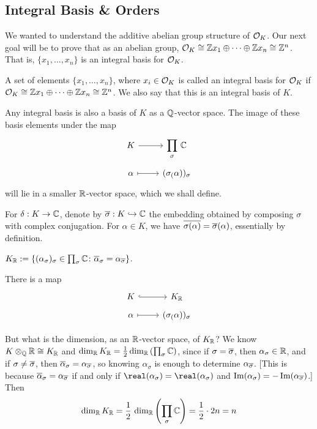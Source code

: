 \subsection{Integral Basis \& Orders}


We wanted to understand the additive abelian group structure of $\mathcal{O}_K$. Our next goal will be to prove that as an abelian group, $\mathcal{O}_K \cong \mathbb{Z} x_1 \oplus \cdots \oplus \mathbb{Z} x_n \cong \mathbb{Z}^n$. That is, $\{x_1,\ldots,x_n\}$ is an integral basis for $\mathcal{O}_K$. 

\begin{dfn}
A set of elements $\{x_1,\ldots,x_n\}$, where $x_i \in \mathcal{O}_K$ is called an integral basis for $\mathcal{O}_K$ if $\mathcal{O}_K \cong \mathbb{Z} x_1 \oplus \cdots \oplus \mathbb{Z} x_n \cong \mathbb{Z}^n$. We also say that this is an integral basis of $K$.
\end{dfn}

Any integral basis is also a basis of $K$ as a $\mathbb{Q}$-vector space. The image of these basis elements under the map
	\[
	\begin{tikzcd}
	K \arrow{r} & \displaystyle\prod_\sigma \, \C \\[-3ex]
	\alpha \arrow[maps to]{r} & (\sigma_(\alpha))_\sigma
	\end{tikzcd}
	\]
will lie in a smaller $\mathbb{R}$-vector space, which we shall define.

For $\delta: K \to \mathbb{C}$, denote by $\overline{\sigma}: K \hookrightarrow \mathbb{C}$ the embedding obtained by composing $\sigma$ with complex conjugation. For $\alpha \in K$, we have $\overline{\sigma(\alpha)}= \overline{\sigma}(\alpha)$, essentially by definition. 

\begin{dfn}
$K_{\mathbb{R}}:= \{(\alpha_\sigma)_\sigma \in \prod_\sigma \mathbb{C} \colon \overline{\alpha}_\sigma = \alpha_{\overline{\sigma}}\}$.
\end{dfn}

There is a map
	\[
	\begin{tikzcd}
	K \arrow[hook]{r} & K_\R \\[-3ex]
	\alpha \arrow[maps to]{r} & (\sigma_(\alpha))_\sigma
	\end{tikzcd}
	\]

But what is the dimension, as an $\mathbb{R}$-vector space, of $K_{\mathbb{R}}$? We know $K \otimes_{\mathbb{Q}} \mathbb{R} \cong K_{\mathbb{R}}$ and $\dim_{\mathbb{R}} K_{\mathbb{R}}= \frac{1}{2} \dim_{\mathbb{R}} \left(\prod_\sigma \mathbb{C}\right)$, since if $\sigma=\overline{\sigma}$, then $\alpha_\sigma \in \mathbb{R}$, and if $\sigma \neq \overline{\sigma}$, then $\overline{\alpha}_\sigma= \alpha_{\overline{\sigma}}$, so knowing $\alpha_\sigma$ is enough to determine $\alpha_{\overline{\sigma}}$. [This is because $\overline{\alpha}_\sigma= \alpha_{\overline{\sigma}}$ if and only if $\real(\alpha_\sigma)=\real(\alpha_\sigma)$ and $\operatorname{Im}(\alpha_\sigma)= -\operatorname{Im}(\alpha_{\overline{\sigma}})$.] Then
	\[
	\dim_{\mathbb{R}} K_{\mathbb{R}} = \frac{1}{2} \, \dim_{\mathbb{R}}\left(\prod_\sigma \mathbb{C} \right) = \frac{1}{2} \cdot 2n=n
	\]


